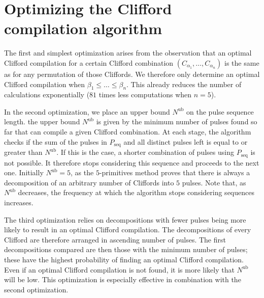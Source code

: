   \section{Optimizing the Clifford compilation algorithm}
    \label{Optimizing the Clifford compilation algorithm}

    The first and simplest optimization arises from the observation that an optimal Clifford compilation for a certain Clifford combination $\left(C_{\alpha_1}, \dots, C_{\alpha_n}\right)$ is the same as for any permutation of those Cliffords. We therefore only determine an optimal Clifford compilation when $\beta_1 \leq \dots \leq \beta_n$. This already reduces the number of calculations exponentially ($81$ times less computations when $n=5$).

    In the second optimization, we place an upper bound $N^\text{ub}$ on the pulse sequence length. the upper bound $N^\text{ub}$ is given by the minimum number of pulses found so far that can compile a given Clifford combination. At each stage, the algorithm checks if the sum of the pulses in $P_\text{seq}$ and all distinct pulses left is equal to or greater than $N^\text{ub}$. If this is the case, a shorter combination of pulses using $P_\text{seq}$ is not possible. It therefore stops considering this sequence and proceeds to the next one. Initially $N^\text{ub}=5$, as the $5$-primitives method proves that there is always a decomposition of an arbitrary number of Cliffords into $5$ pulses. Note that, as $N^\text{ub}$ decreases, the frequency at which the algorithm stops considering sequences increases.

    The third optimization relies on decompositions with fewer pulses being more likely to result in an optimal Clifford compilation. The decompositions of every Clifford are therefore arranged in ascending number of pulses. The first decompositions compared are then those with the minimum number of pulses; these have the highest probability of finding an optimal Clifford compilation. Even if an optimal Clifford compilation is not found, it is more likely that $N^\text{ub}$ will be low. This optimization is especially effective in combination with the second optimization.

